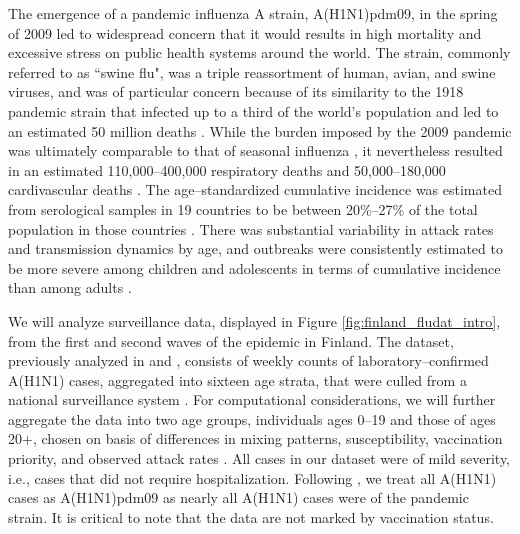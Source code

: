 The emergence of a pandemic influenza A strain, A(H1N1)pdm09, in the spring of 2009 led to widespread concern that it would results in high mortality and excessive stress on public health systems around the world. The strain, commonly referred to as ``swine flu", was a triple reassortment of human, avian, and swine viruses, and was of particular concern because of its similarity to the 1918 pandemic strain that infected up to a third of the world's population and led to an estimated 50 million deaths \cite{cdc1918pandemic}. While the burden imposed by the 2009 pandemic was ultimately comparable to that of seasonal influenza \cite{iuliano2018estimates}, it nevertheless resulted in an estimated 110,000--400,000 respiratory deaths and 50,000--180,000 cardivascular deaths \cite{dawood2012estimated}. The age--standardized cumulative incidence was estimated from serological samples in 19 countries to be between 20\%--27\% of the total population in those countries \cite{van2013estimating}. There was substantial variability in attack rates and transmission dynamics by age, and outbreaks were consistently estimated to be more severe among children and adolescents in terms of cumulative incidence than among adults \cite{opatowski2011transmission,steens2011age,van2013estimating,yang2015inference}. 

We will analyze surveillance data, displayed in Figure \ref{fig:finland_fludat_intro}, from the first and second waves of the epidemic in Finland. The dataset, previously analyzed in \cite{shubin2016revealing} and \cite{shubin2014estimating}, consists of weekly counts of laboratory--confirmed A(H1N1) cases, aggregated into sixteen age strata, that were culled from a national surveillance system \cite{lyytikainen2011surveillance}. For computational considerations, we will further aggregate the data into two age groups, individuals ages 0--19 and those of ages 20+, chosen on basis of differences in mixing patterns, susceptibility, vaccination priority, and observed attack rates \cite{kelly2011age,opatowski2011transmission,steens2011age}. All cases in our dataset were of mild severity, i.e., cases that did not require hospitalization. Following \cite{shubin2016revealing,shubin2014estimating}, we treat all A(H1N1) cases as A(H1N1)pdm09 as nearly all A(H1N1) cases were of the pandemic strain. It is critical to note that the data are not marked by vaccination status.


